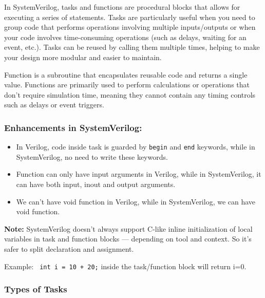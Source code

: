 \documentclass[12pt, a4paper]{article}
\begin{document}
In SystemVerilog, tasks and functions are procedural blocks that allows for executing a series of statements. Tasks are particularly useful when you need to group code that performs operations involving multiple inputs/outputs or when your code involves time-consuming operations (such as delays, waiting for an event, etc.). Tasks can be reused by calling them multiple times, helping to make your design more modular and easier to maintain.

Function is a subroutine that encapsulates reusable code and returns a single value. Functions are primarily used to perform calculations or operations that don't require simulation time, meaning they cannot contain any timing controls such as delays or event triggers.

\subsubsection{Enhancements in SystemVerilog:}

\begin{itemize}
    \item In Verilog, code inside task is guarded by \texttt{begin} and \texttt{end} keywords, while in SystemVerilog, no need to write these keywords.
    \item Function can only have input arguments in Verilog, while in SystemVerilog, it can have both input, inout and output arguments.
    \item We can't have void function in Verilog, while in SystemVerilog, we can have void function.
\end{itemize}

\textbf{Note:} SystemVerilog doesn't always support C-like inline initialization of local variables in task and function blocks — depending on tool and context. So it's safer to split declaration and assignment.

Example: \texttt{ int i = 10 + 20;} inside the task/function block will return i=0.

\subsubsection{Types of Tasks}
\end{document}
